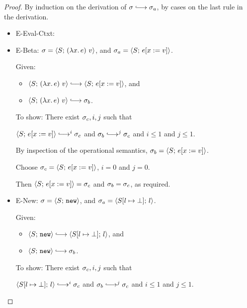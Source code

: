 \begin{proof}
  By induction on the derivation of $\conf \parstepsto \conf_a$, by
  cases on the last rule in the derivation.

  \begin{itemize}
    \item {\sc E-Eval-Ctxt}: 

    \item {\sc E-Beta}: $\sigma = \langle S;\, (\lambda x.\,e)~v \rangle$,
      and $\sigma_a = \langle S;\, e[x := v] \rangle$.

      Given:
      \begin{itemize}
      \item $\config{S}{\app{(\lam{x}{e})}{v}} \parstepsto
        \config{S}{\subst{e}{x}{v}}$, and
      \item $\config{S}{\app{(\lam{x}{e})}{v}} \parstepsto \conf_b$.
      \end{itemize}

      To show: There exist $\sigma_c, i, j$ such that

      $\config{S}{\subst{e}{x}{v}} \parstepsto^i \conf_c$ and $\conf_b
      \parstepsto^j \conf_c$ and $i \leq 1$ and $j \leq 1$.

      By inspection of the operational semantics, $\sigma_b =
      \langle S;\, e[x := v] \rangle$.

      Choose $\sigma_c = \langle S;\, e[x := v] \rangle$, $i = 0$ and $j =
      0$.

      Then $\langle S;\, e[x := v] \rangle = \sigma_c$ and $\sigma_b =
      \sigma_c$, as required.

    \item {\sc E-New}: $\sigma = \langle S;\, \mbox{\texttt{new}} \rangle$, and $\sigma_a =
      \langle S[l \mapsto \bot];\, l \rangle$.

      Given:
      \begin{itemize}
      \item $\config{S}{\NEW} \parstepsto
        \config{\extSRaw{S}{l}{\bot}}{l}$, and
      \item $\config{S}{\NEW} \parstepsto \conf_b$.
      \end{itemize}

      To show: There exist $\sigma_c, i, j$ such that

      $\config{\extSRaw{S}{l}{\bot}}{l} \parstepsto^i
      \conf_c$ and $\conf_b \parstepsto^j \conf_c$ and $i \leq 1$ and
      $j \leq 1$.


\end{itemize}
\end{proof}
